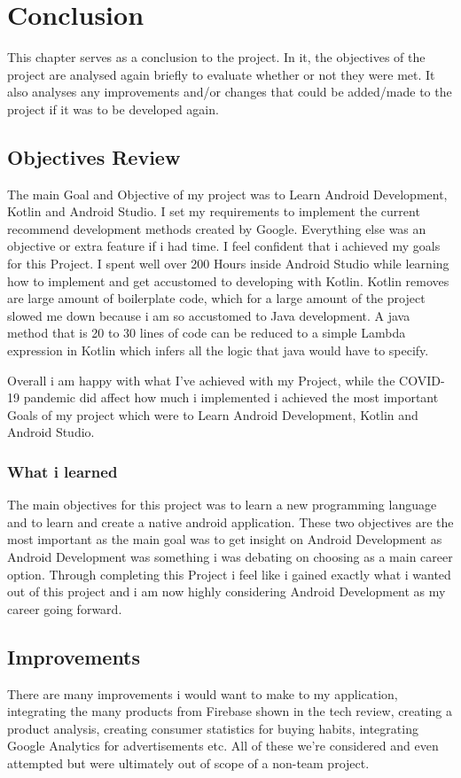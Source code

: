 \chapter{Conclusion}
This chapter serves as a conclusion to the project. In it, the objectives of the project are analysed again briefly to evaluate whether or not they were met. It also analyses any improvements and/or changes that could be added/made to the project if it was to be developed again.

\section{Objectives Review}
The main Goal and Objective of my project was to Learn Android Development, Kotlin and Android Studio. I set my requirements to implement the current recommend development methods created by Google. Everything else was an objective or extra feature if i had time. I feel confident that i achieved my goals for this Project. I spent well over 200 Hours inside Android Studio while learning how to implement and get accustomed to developing with Kotlin. Kotlin removes are large amount of boilerplate code, which for a large amount of the project slowed me down because i am so accustomed to Java development. A java method that is 20 to 30 lines of code can be reduced to a simple Lambda expression in Kotlin which infers all the logic that java would have to specify. \newline

Overall i am happy with what I've achieved with my Project, while the COVID-19 pandemic did affect how much i implemented i achieved the most important Goals of my project which were to Learn Android Development, Kotlin and Android Studio.
\newpage
\subsection{What i learned}
The main objectives for this project was to learn a new programming language and to learn and create a native android application. These two objectives are the most important as the main goal was to get insight on Android Development as Android Development was something i was debating on choosing as a main career option.
Through completing this Project i feel like i gained exactly what i wanted out of this project and i am now highly considering Android Development as my career going forward. 
\bigskip

\section{Improvements}
There are many improvements i would want to make to my application, integrating the many products from Firebase shown in the tech review, creating a product analysis, creating consumer statistics for buying habits, integrating Google Analytics for advertisements etc. All of these we're considered and even attempted but were ultimately out of scope of a non-team project.
\bigskip

